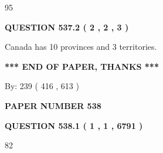 \documentclass[12pt]{article}
\begin{document}
 
\noindent{}

95
 
 
  
\vspace{0.2in}
  
{\textbf{\Large{QUESTION
537.2 
 ( 2 , 2 , 3 )
}}}
  
  
 
 
\noindent{}
 
 
Canada has 10  provinces and 3 territories.
 
 
 
 
   
   
 \vspace{0.2in}
 
   
   
   
   
\vspace{1.0in} 
{\textbf{\large{ *** END OF PAPER, THANKS *** }}} 
   
   
\hspace{1.0in} By: 
 239 ( 416 ,  613 )
   
   
   
   
\newpage 
\setcounter{page}{ 
   538001 } 
   
   
   
   
 {\textbf{ \Large{ PAPER NUMBER  538  }}}
   
   
\vspace{0.2in}
   
   
   
   
   
   
 \vspace{0.2in}
 
 
 
 
   
   
  
\vspace{0.2in}
  
{\textbf{\Large{QUESTION
538.1 
 ( 1 , 1 , 6791 )
}}}
  
  
 
 
\noindent{}

82
 
 
  
\end{document}
